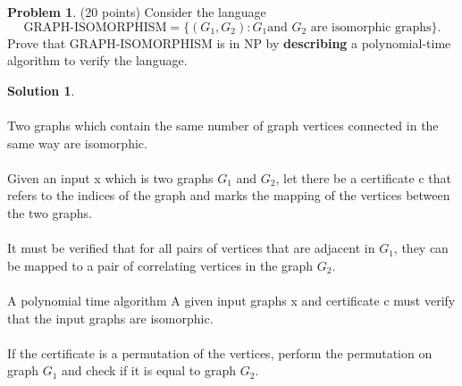 \documentclass{article}
\theoremstyle{definition}
\newtheorem{problem}{Problem}
\newtheorem*{solution}{Solution}
\begin{document}
\begin{problem} (20 points) 
Consider the language 
$$\text{GRAPH-ISOMORPHISM} = \{ (G_1, G_2) : G_1 \text{
  and } G_2 \text{ are isomorphic
graphs}\}.$$ Prove that GRAPH-ISOMORPHISM is in NP by \textbf{describing} a
polynomial-time algorithm to verify the language. 
\end{problem}
\begin{solution} \\
\\
Two graphs which contain the same number of graph vertices connected in the same way are isomorphic.\\
\\
Given an input x which is two graphs $G_1$ and $G_2$, let there be a certificate c that refers to the indices of the graph and marks the mapping of the vertices between the two graphs.\\
\\
It must be verified that for all pairs of vertices that are adjacent in $G_1$, they can be mapped to a pair of correlating vertices in the graph $G_2$.\\
\\
A polynomial time algorithm A given input graphs x and certificate c must verify that the input graphs are isomorphic.\\
\\
If the certificate is a permutation of the vertices, perform the permutation on graph $G_1$ and check if it is equal to graph $G_2$.\\
\\

\end{solution}

 \newpage
\end{document}
